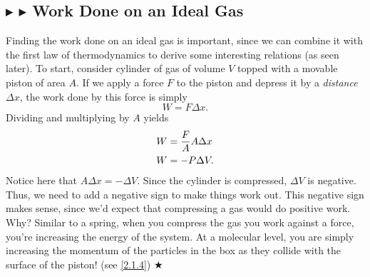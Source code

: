 %
%
\subsection{\color{RoyalBlue} $\blacktriangleright$ \color{Orchid} $\blacktriangleright$ \color{black} Work Done on an Ideal Gas} \label{2.2.1}
Finding the work done on an ideal gas is important, since we can combine it with the first law of thermodynamics to derive some interesting relations (as seen later). To start, consider cylinder of gas of volume $V$ topped with a movable piston of area $A$. If we apply a force $F$ to the piston and depress it by a \textit{distance} $\Delta x$, the work done by this force is simply
\begin{equation*}
    W = F\Delta x.
\end{equation*}
\noindent Dividing and multiplying by $A$ yields
\begin{align}
    W &= \frac{F}{A}A\Delta x \nonumber \\
    W &= -P\Delta V.
\end{align}
\noindent Notice here that $A\Delta x = -\Delta V$. Since the cylinder is compressed, $\Delta V$ is negative. Thus, we need to add a negative sign to make things work out. This negative sign makes sense, since we'd expect that compressing a gas would do positive work. Why? Similar to a spring, when you compress the gas you work against a force, you're increasing the energy of the system. At a molecular level, you are simply increasing the momentum of the particles in the box as they collide with the surface of the piston! (see \ref{2.1.4}) $\bigstar$

%
%
